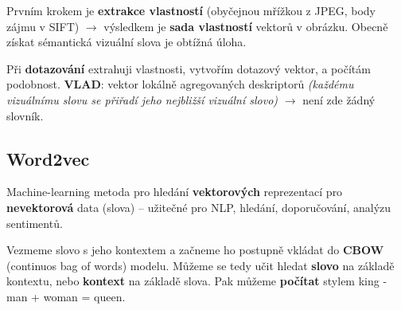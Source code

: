 Prvním krokem je \textbf{extrakce vlastností} (obyčejnou mřížkou z JPEG, body zájmu v SIFT) $\to$ výsledkem je \textbf{sada vlastností} vektorů v obrázku. Obecně získat sémantická vizuální slova je obtížná úloha.

Při \textbf{dotazování} extrahuji vlastnosti, vytvořím dotazový vektor, a počítám podobnost. \textbf{VLAD}: vektor lokálně agregovaných deskriptorů \textit{(každému vizuálnímu slovu se přiřadí jeho nejbližší vizuální slovo)} $\to$ není zde žádný slovník.

\subsection{Word2vec}

Machine-learning metoda pro hledání \textbf{vektorových} reprezentací pro \textbf{nevektorová} data (slova) -- užitečné pro NLP, hledání, doporučování, analýzu sentimentů.

Vezmeme slovo s jeho kontextem a začneme ho postupně vkládat do \textbf{CBOW} (continuos bag of words) modelu. Můžeme se tedy učit hledat \textbf{slovo} na základě kontextu, nebo \textbf{kontext} na základě slova. Pak můžeme \textbf{počítat} stylem king - man + woman = queen.
